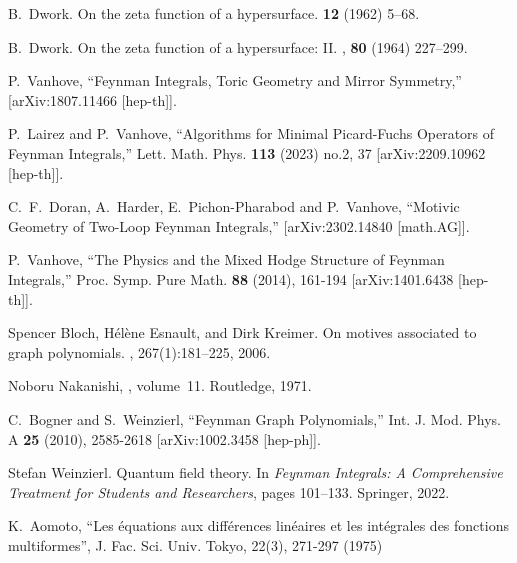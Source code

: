 \documentclass[a4paper,12pt]{article}
\numberwithin{equation}{section}
\numberwithin{figure}{section}
\begin{document}
\begin{thebibliography}{99}
B.~Dwork.
\newblock On the zeta function of a hypersurface.
 {\bf 12} (1962) 5--68.

B.~Dwork.
\newblock On the zeta function of a hypersurface: {{II}}.
, {\bf 80} (1964) 227--299.
  
P.~Vanhove,
``Feynman Integrals, Toric Geometry and Mirror Symmetry,''
[arXiv:1807.11466 [hep-th]].
  
P.~Lairez and P.~Vanhove,
``Algorithms for Minimal Picard-Fuchs Operators of Feynman Integrals,''
Lett. Math. Phys. \textbf{113} (2023) no.2, 37
[arXiv:2209.10962 [hep-th]].

C.~F.~Doran, A.~Harder, E.~Pichon-Pharabod and P.~Vanhove,
``Motivic Geometry of Two-Loop Feynman Integrals,''
[arXiv:2302.14840 [math.AG]].

  
P.~Vanhove,
``The Physics and the Mixed Hodge Structure of Feynman Integrals,''
Proc. Symp. Pure Math. \textbf{88} (2014), 161-194
[arXiv:1401.6438 [hep-th]].
  
Spencer Bloch, H{\'e}l{\`e}ne Esnault, and Dirk Kreimer.
\newblock On motives associated to graph polynomials.
,
267(1):181--225, 2006.



Noboru Nakanishi,
, volume~11.
\newblock Routledge, 1971.


C.~Bogner and S.~Weinzierl,
``Feynman Graph Polynomials,''
Int. J. Mod. Phys. A \textbf{25} (2010), 2585-2618
[arXiv:1002.3458 [hep-ph]].

Stefan Weinzierl.
\newblock Quantum field theory.
\newblock In {\em Feynman Integrals: A Comprehensive Treatment for Students and
  Researchers}, pages 101--133. Springer, 2022.
\newblock [arXiv:2201.03593] 
  


    K.~Aomoto, ``Les \'equations aux diff\'erences
     lin\'eaires et les int\'egrales des fonctions multiformes'',
     J. Fac. Sci. Univ. Tokyo, 22(3), 271-297  (1975)


\end{thebibliography}
\end{document}
